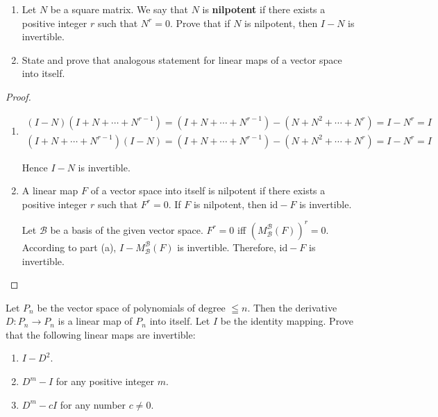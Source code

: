\begin{exercise}
    \begin{enumerate}[label={(\alph*)}]
        \item Let $N$ be a square matrix. We say that $N$ is \textbf{nilpotent} if there exists a positive integer $r$ such that $N^{r} = 0$. Prove that if $N$ is nilpotent, then $I - N$ is invertible.
        \item State and prove that analogous statement for linear maps of a vector space into itself.
    \end{enumerate}
\end{exercise}

\begin{proof}
    \begin{enumerate}[label={(\alph*)}]
        \item \[
                  \begin{split}
                      (I - N)(I + N + \cdots + N^{r-1}) = (I + N + \cdots + N^{r-1}) - (N + N^{2} + \cdots + N^{r}) = I - N^{r} = I \\
                      (I + N + \cdots + N^{r-1})(I - N) = (I + N + \cdots + N^{r-1}) - (N + N^{2} + \cdots + N^{r}) = I - N^{r} = I
                  \end{split}
              \]

              Hence $I - N$ is invertible.
        \item A linear map $F$ of a vector space into itself is nilpotent if there exists a positive integer $r$ such that $F^{r} = 0$. If $F$ is nilpotent, then $\text{id} - F$ is invertible.

              Let $\mathscr{B}$ be a basis of the given vector space. $F^{r} = 0$ iff ${(M^{\mathscr{B}}_{\mathscr{B}}(F))}^{r} = 0$. According to part (a), $I - M^\mathscr{B}_{\mathscr{B}}(F)$ is invertible. Therefore, $\text{id} - F$ is invertible.
    \end{enumerate}
\end{proof}

\begin{exercise}
    Let $P_{n}$ be the vector space of polynomials of degree $\leqq n$. Then the derivative $D: P_{n} \to P_{n}$ is a linear map of $P_{n}$ into itself. Let $I$ be the identity mapping. Prove that the following linear maps are invertible:
    \begin{enumerate}[label={(\alph*)}]
        \item $I - D^{2}$.
        \item $D^{m} - I$ for any positive integer $m$.
        \item $D^{m} - cI$ for any number $c\ne 0$.
    \end{enumerate}
\end{exercise}

